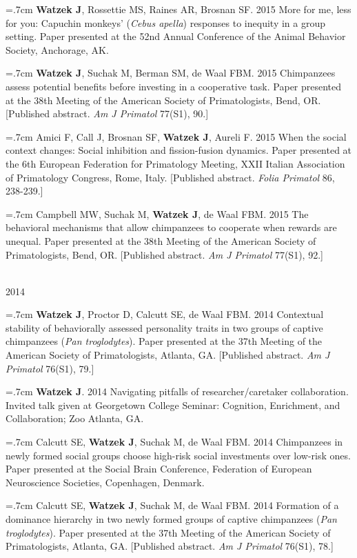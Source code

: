 \documentclass[]{friggeri-cv}
\begin{document}
\hangindent=.7cm \textbf{Watzek J}, Rossettie MS, Raines AR, Brosnan SF. 2015 More for me, less for you: Capuchin monkeys' (\emph{Cebus apella}) responses to inequity in a group setting. Paper presented at the 52nd Annual Conference of the Animal Behavior Society, Anchorage, AK.

\hangindent=.7cm \textbf{Watzek J}, Suchak M, Berman SM, de Waal FBM. 2015 Chimpanzees assess potential benefits before investing in a cooperative task. Paper presented at the 38th Meeting of the American Society of Primatologists, Bend, OR. [Published abstract. \emph{Am J Primatol} 77(S1), 90.]

\hangindent=.7cm Amici F, Call J, Brosnan SF, \textbf{Watzek J}, Aureli F. 2015 When the social context changes: Social inhibition and fission-fusion dynamics. Paper presented at the 6th European Federation for Primatology Meeting, XXII Italian Association of Primatology Congress, Rome, Italy. [Published abstract. \emph{Folia Primatol} 86, 238-239.]

\hangindent=.7cm Campbell MW, Suchak M, \textbf{Watzek J}, de Waal FBM. 2015 The behavioral mechanisms that allow chimpanzees to cooperate when rewards are unequal. Paper presented at the 38th Meeting of the American Society of Primatologists, Bend, OR. [Published abstract. \emph{Am J Primatol} 77(S1), 92.]


{\large{} ~\\[-.15cm] 2014}

\hangindent=.7cm \textbf{Watzek J}, Proctor D, Calcutt SE, de Waal FBM. 2014 Contextual stability of behaviorally assessed personality traits in two groups of captive chimpanzees (\emph{Pan troglodytes}). Paper presented at the 37th Meeting of the American Society of Primatologists, Atlanta, GA. [Published abstract. \emph{Am J Primatol} 76(S1), 79.]

\hangindent=.7cm \textbf{Watzek J}. 2014 Navigating pitfalls of researcher/caretaker collaboration. Invited talk given at Georgetown College Seminar: Cognition, Enrichment, and Collaboration; Zoo Atlanta, GA.

\hangindent=.7cm Calcutt SE, \textbf{Watzek J}, Suchak M, de Waal FBM. 2014 Chimpanzees in newly formed social groups choose high-risk social investments over low-risk ones. Paper presented at the Social Brain Conference, Federation of European Neuroscience Societies, Copenhagen, Denmark.

\hangindent=.7cm Calcutt SE, \textbf{Watzek J}, Suchak M, de Waal FBM. 2014 Formation of a dominance hierarchy in two newly formed groups of captive chimpanzees (\emph{Pan troglodytes}). Paper presented at the 37th Meeting of the American Society of Primatologists, Atlanta, GA. [Published abstract. \emph{Am J Primatol} 76(S1), 78.]
\end{document}
